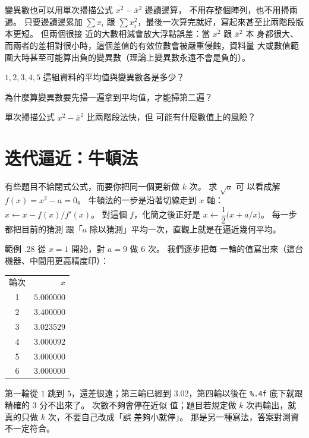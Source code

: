 變異數也可以用單次掃描公式 $\overline{x^2} - \overline{x}^2$ 邊讀邊算，
不用存整個陣列，也不用掃兩遍。 只要邊讀邊累加 $\sum x_i$ 跟
$\sum x_i^2$，最後一次算完就好，寫起來甚至比兩階段版本更短。 但兩個很接
近的大數相減會放大浮點誤差：當 $\overline{x^2}$ 跟 $\overline{x}^2$ 本
身都很大、而兩者的差相對很小時，這個差值的有效位數會被嚴重侵蝕，資料量
大或數值範圍大時甚至可能算出負的變異數（理論上變異數永遠不會是負的）。


\begin{drills}[label=drills:float-mean-variance]
\item $1, 2, 3, 4, 5$ 這組資料的平均值與變異數各是多少？
\item 為什麼算變異數要先掃一遍拿到平均值，才能掃第二遍？
\item 單次掃描公式 $\overline{x^2} - \overline{x}^2$ 比兩階段法快，但
可能有什麼數值上的風險？
\end{drills}

\section{迭代逼近：牛頓法}
\label{sec:float-newton}

有些題目不給閉式公式，而要你把同一個更新做 $k$ 次。 求 $\sqrt{a}$ 可
以看成解 $f(x) = x^2 - a = 0$。 牛頓法的一步是沿著切線走到 $x$ 軸：
$x \leftarrow x - f(x)/f'(x)$。 對這個 $f$，化簡之後正好是
$x \leftarrow \dfrac{1}{2}\bigl(x + a/x\bigr)$。 每一步都把目前的猜測
跟「$a$ 除以猜測」平均一次，直觀上就是在逼近幾何平均。

範例 \thechapter.28 從 $x=1$ 開始，對 $a=9$ 做 $6$ 次。 我們逐步把每
一輪的值寫出來（這台機器、中間用更高精度印）：

\begin{center}
\begin{tabular}{cr}
輪次 & $x$ \\
1 & $5.000000$ \\
2 & $3.400000$ \\
3 & $3.023529$ \\
4 & $3.000092$ \\
5 & $3.000000$ \\
6 & $3.000000$ \\
\end{tabular}
\end{center}

第一輪從 $1$ 跳到 $5$，還差很遠；第三輪已經到 $3.02$，第四輪以後在
\texttt{\%.4f} 底下就跟精確的 $3$ 分不出來了。 次數不夠會停在近似
值；題目若規定做 $k$ 次再輸出，就真的只做 $k$ 次，不要自己改成「誤
差夠小就停」。 那是另一種寫法，答案對測資不一定符合。

